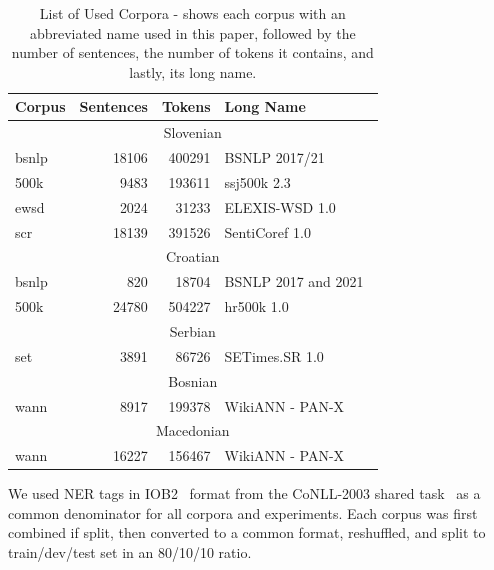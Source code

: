 \documentclass[sigconf]{acmart}
\newcommand{\mpu}[1]{\hl{\textbf{MP:} #1}}
\begin{document}
\begin{table}[H]
  \caption{List of Used Corpora - shows each corpus with an abbreviated name used in this paper, followed by the number of sentences, the number of tokens it contains, and lastly, its long name.}
  \label{tab:corpora}
  \begin{tabular}{lrrl}
    \toprule
    Corpus&Sentences&Tokens&Long Name\\
    \midrule
    \multicolumn{4}{c}{Slovenian} \\
    \midrule
    bsnlp&18106&400291&BSNLP 2017/21~\cite{piskorski-etal-2021-slav}\\
    500k&9483&193611&ssj500k 2.3~\cite{ssj500k-23}\\
    ewsd&2024&31233&{ELEXIS}-{WSD} 1.0~\cite{ELEXIS-WSD-10}\\
    scr&18139&391526&{SentiCoref} 1.0~\cite{SentiCoref-10}\\
    \midrule
    \multicolumn{4}{c}{Croatian} \\
    \midrule
    bsnlp&820&18704&BSNLP 2017 and 2021~\cite{piskorski-etal-2021-slav}\\
    500k&24780&504227&hr500k 1.0 ~ \cite{hr500k-10}\\
    \midrule
    \multicolumn{4}{c}{Serbian} \\
    \midrule
    set&3891&86726&{SETimes}.{SR} 1.0~\cite{SETimes-SR-1.0}\\
    \midrule
    \multicolumn{4}{c}{Bosnian} \\
    \midrule
    wann&8917&199378&WikiANN - PAN-X~\cite{rahimi-etal-2019-massively}\\
    \midrule
    \multicolumn{4}{c}{Macedonian} \\
    \midrule
    wann&16227&156467&WikiANN - PAN-X~\cite{rahimi-etal-2019-massively}\\
  \bottomrule
  \end{tabular}
\end{table}
We used NER tags in IOB2~\cite{IOB2} format from the CoNLL-2003 shared task~\cite{CoNLL2003} as a common denominator for all corpora and experiments.
Each corpus was first combined if split, then converted to a common format, reshuffled, and split to train/dev/test set in an 80/10/10 ratio.

\end{document}
